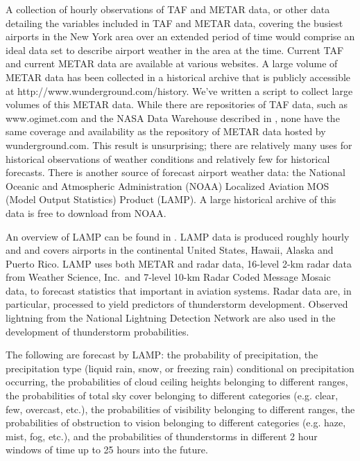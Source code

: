 \documentclass[11pt]{scrartcl}
\begin{document}
A collection of hourly observations of TAF and METAR data, or other data detailing the variables included in TAF and METAR data, covering the busiest airports in the New York area over an extended period of time would comprise an ideal data set to describe airport weather in the area at the time.  Current TAF and current METAR data are available at various websites. A large volume of METAR data has been collected in a historical archive that is publicly accessible at http://www.wunderground.com/history.  We've written a script to collect large volumes of this METAR data. While there are repositories of TAF data, such as www.ogimet.com and the NASA Data Warehouse described in \cite{NASA_data}, none have the same coverage and availability as the repository of METAR data hosted by wunderground.com. This result is unsurprising; there are relatively many uses for historical observations of weather conditions and relatively few for historical forecasts. There is another source of forecast airport weather data: the National Oceanic and Atmospheric Administration (NOAA) Localized Aviation MOS (Model Output Statistics) Product (LAMP). A large historical archive of this data is free to download from NOAA.

An overview of LAMP can be found in \cite{ghirardelli2005overview}.  LAMP data is produced roughly hourly and and covers airports in the continental United States, Hawaii, Alaska and Puerto Rico.  LAMP uses both METAR and radar data, 16-level 2-km radar data from Weather Science, Inc.\ and 7-level 10-km Radar Coded Message Mosaic data, to forecast statistics that important in aviation systems. Radar data are, in particular, processed to yield predictors of thunderstorm development.  Observed lightning from the National Lightning Detection Network are also used in the development of thunderstorm probabilities. 

The following are forecast by LAMP: the probability of precipitation, the precipitation type (liquid rain, snow, or freezing rain) conditional on precipitation occurring, the probabilities of cloud ceiling heights belonging to different ranges, the probabilities of total sky cover belonging to different categories (e.g. clear, few, overcast, etc.), the probabilities of visibility belonging to different ranges, the probabilities of obstruction to vision belonging to different categories (e.g. haze, mist, fog, etc.), and the probabilities of thunderstorms in different 2 hour windows of time up to 25 hours into the future.
\end{document}
